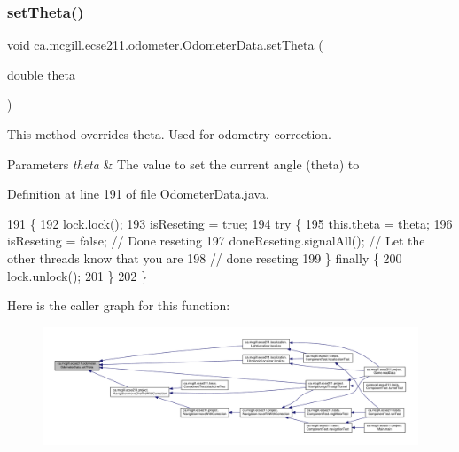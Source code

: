 \subsubsection{\texorpdfstring{set\+Theta()}{setTheta()}}
{\footnotesize\ttfamily void ca.\+mcgill.\+ecse211.\+odometer.\+Odometer\+Data.\+set\+Theta (\begin{DoxyParamCaption}\item[{double}]{theta }\end{DoxyParamCaption})}

This method overrides theta. Used for odometry correction.


\begin{DoxyParams}{Parameters}
{\em theta} & The value to set the current angle (theta) to \\
\hline
\end{DoxyParams}


Definition at line 191 of file Odometer\+Data.\+java.


\begin{DoxyCode}
191                                      \{
192     lock.lock();
193     isReseting = \textcolor{keyword}{true};
194     \textcolor{keywordflow}{try} \{
195       this.theta = theta;
196       isReseting = \textcolor{keyword}{false}; \textcolor{comment}{// Done reseting}
197       doneReseting.signalAll(); \textcolor{comment}{// Let the other threads know that you are}
198                                 \textcolor{comment}{// done reseting}
199     \} \textcolor{keywordflow}{finally} \{
200       lock.unlock();
201     \}
202   \}
\end{DoxyCode}
Here is the caller graph for this function\+:
\nopagebreak
\begin{figure}[H]
\begin{center}
\leavevmode
\includegraphics[width=350pt]{classca_1_1mcgill_1_1ecse211_1_1odometer_1_1_odometer_data_a419b8f07c2c5374411c8e62298e9a402_icgraph}
\end{center}
\end{figure}
\mbox{\label{classca_1_1mcgill_1_1ecse211_1_1odometer_1_1_odometer_data_a2911d7215e47f3064defe016b46bfeef}} 
